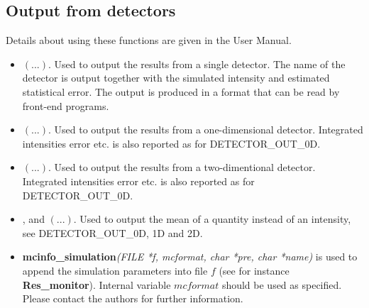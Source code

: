 \subsection{Output from detectors}
Details about using these functions are given in the \MCS User Manual.
\begin{itemize}
\item {}$(...)$. Used to output the results from a
  single detector. The name of the detector is output together
  with the simulated intensity and estimated statistical error. The
  output is produced in a format that can be read by \MCS front-end
  programs.
\item {}$(...)$. Used to output the results from a
  one-dimensional detector. Integrated intensities error etc. is also
  reported as for DETECTOR\_OUT\_0D.
\item {}$(...)$. Used to output the results from a
  two-dimentional detector. Integrated intensities error etc. is also
  reported as for DETECTOR\_OUT\_0D.
\item {},  and $(...)$. Used to output
  the mean of a quantity instead of an intensity, see DETECTOR\_OUT\_0D, 1D and 2D.
\item \textbf{mcinfo\_simulation}\textit{(FILE *f, mcformat,
  char *pre, char *name)} is used to append the simulation parameters into file $f$
  (see for instance \textbf{Res\_monitor}).
  Internal variable $mcformat$ should be used as specified.
  Please contact the authors for further information.
\end{itemize}

